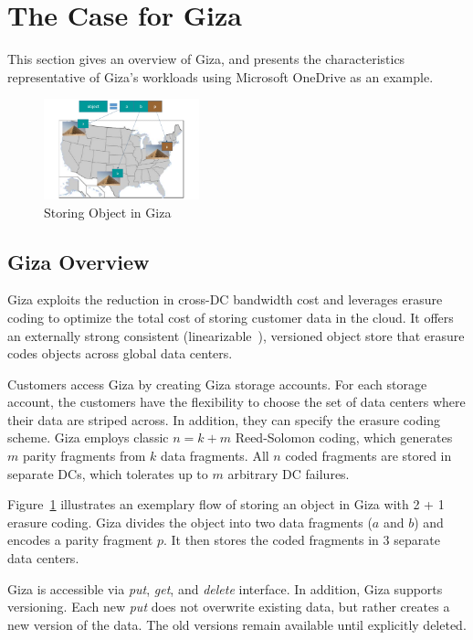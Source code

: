 \section{The Case for Giza}
\label{sec:motivation}

This section gives an overview of Giza, and presents the characteristics
representative of Giza's workloads using Microsoft OneDrive as an example.

\begin{figure}[tp]
\centering
\includegraphics[width=0.4\textwidth]{images/giza_example_crop_fit}
\caption{Storing Object in Giza}
\label{fig:giza_example}
\end{figure}

\subsection{Giza Overview}

Giza exploits the reduction in cross-DC bandwidth cost and leverages erasure
coding to optimize the total cost of storing customer data in the cloud. It
offers an externally strong consistent
(linearizable~\cite{herlihy90linearizability}), versioned object store that
erasure codes objects across global data centers.

Customers access Giza by creating Giza storage accounts. For each storage
account, the customers have the flexibility to choose the set of data centers
where their data are striped across. In addition, they can specify the erasure
coding scheme. Giza employs classic $n = k + m$ Reed-Solomon coding, which
generates $m$ parity fragments from $k$ data fragments. All $n$ coded fragments
are stored in separate DCs, which tolerates up to $m$ arbitrary DC failures.

Figure~\ref{fig:giza_example} illustrates an exemplary flow of storing an object
in Giza with 2 + 1 erasure coding. Giza divides the object into two data
fragments ($a$ and $b$) and encodes a parity fragment $p$. It then stores the
coded fragments in $3$ separate data centers.

Giza is accessible via {\em put}, {\em get}, and {\em delete} interface. In
addition, Giza supports versioning. Each new {\em put} does not overwrite
existing data, but rather creates a new version of the data. The old versions
remain available until explicitly deleted.

